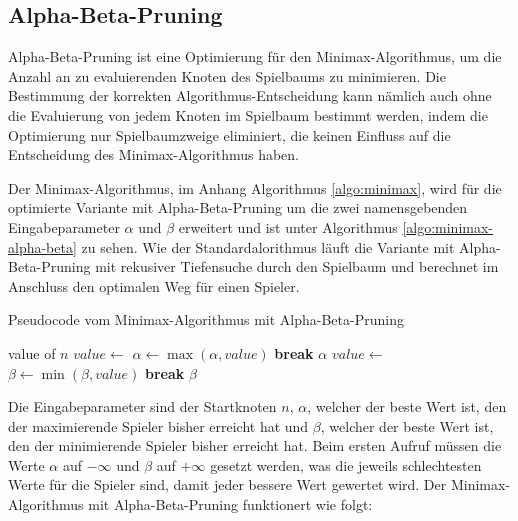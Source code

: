 \subsection{Alpha-Beta-Pruning}

Alpha-Beta-Pruning ist eine Optimierung für den Minimax-Algorithmus, um die Anzahl an zu evaluierenden Knoten des Spielbaums zu minimieren. Die Bestimmung der korrekten Algorithmus-Entscheidung kann nämlich auch ohne die Evaluierung von jedem Knoten im Spielbaum bestimmt werden, indem die Optimierung nur Spielbaumzweige eliminiert, die keinen Einfluss auf die Entscheidung des Minimax-Algorithmus haben. \cite{AlgorithmsAlphaBetaPruning}

Der Minimax-Algorithmus, im Anhang Algorithmus \ref{algo:minimax}, wird für die optimierte Variante mit Alpha-Beta-Pruning um die zwei namensgebenden Eingabeparameter $\alpha$ und $\beta$ erweitert und ist unter Algorithmus \ref{algo:minimax-alpha-beta} zu sehen. Wie der Standardalorithmus läuft die Variante mit Alpha-Beta-Pruning mit rekusiver Tiefensuche durch den Spielbaum und berechnet im Anschluss den optimalen Weg für einen Spieler.


\begin{algorithm}
    \caption{Pseudocode vom Minimax-Algorithmus mit Alpha-Beta-Pruning}
    \label{algo:minimax-alpha-beta}
    \begin{algorithmic}[1]
        \State \Return value of $n$
        \State $value \gets$ 
        \State $\alpha \gets \max(\alpha, value)$
        \If{$\alpha \geq \beta$}
        \State \textbf{break}
        \EndIf
        \EndFor
        \State \Return $\alpha$
        \State $value \gets$ 
        \State $\beta \gets \min(\beta, value)$
        \If{$\beta \leq \alpha$}
        \State \textbf{break}
        \EndIf
        \EndFor
        \State \Return $\beta$
        \EndIf
        \EndFunction
    \end{algorithmic}
\end{algorithm}

Die Eingabeparameter sind der Startknoten $n$, $\alpha$, welcher der beste Wert ist, den der maximierende Spieler bisher erreicht hat und $\beta$, welcher der beste Wert ist, den der minimierende Spieler bisher erreicht hat. Beim ersten Aufruf müssen die Werte $\alpha$ auf $-\infty$ und $\beta$ auf $+\infty$ gesetzt werden, was die jeweils schlechtesten Werte für die Spieler sind, damit jeder bessere Wert gewertet wird. Der Minimax-Algorithmus mit Alpha-Beta-Pruning funktionert wie folgt:

